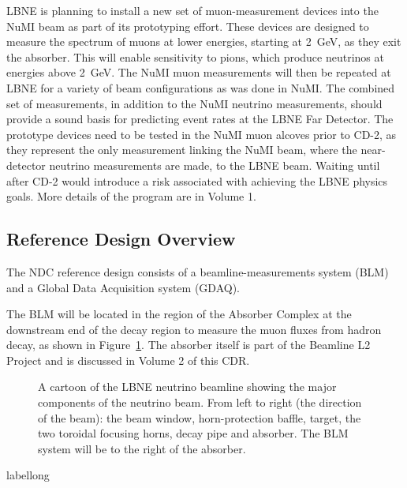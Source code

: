 
LBNE is planning to install a new set of muon-measurement devices into the 
NuMI beam as part of its prototyping effort. 
These devices are designed to measure the spectrum of muons at lower energies, starting at 2~GeV, as they exit the absorber. This will enable sensitivity to pions, which produce neutrinos at energies above 2~GeV. The NuMI muon measurements will then be repeated at LBNE for a variety of beam configurations as was done in NuMI. The combined set of measurements, in addition to the NuMI neutrino measurements, should provide a sound basis for predicting event rates at the LBNE Far Detector.
The prototype devices need to be tested in the NuMI muon alcoves prior to CD-2, as they represent the only measurement linking the NuMI beam, where the near-detector neutrino measurements are made, to the LBNE beam. Waiting until after CD-2 would introduce a risk associated with achieving the LBNE physics goals.  More details of the program are in Volume 1.

\subsection{Reference Design Overview}  %

The NDC reference design consists of a beamline-measurements system (BLM) and a Global Data Acquisition system (GDAQ).

The BLM will be located in the region of the Absorber Complex at the downstream end 
of the decay region to measure the muon fluxes from hadron decay, as shown in Figure~\ref{fig:schematic-nu-beamline-ndc}. The absorber itself is part of the Beamline L2 Project and is discussed in Volume 2 of this CDR. 

\begin{figure}[htbp]
\centering
\caption[Cartoon of the LBNE neutrino beamline components]{A cartoon of the LBNE neutrino beamline showing the major components of the neutrino beam. From left to right (the direction of the beam): the beam window, horn-protection baffle, target, the two toroidal focusing horns, decay pipe and absorber. The BLM system will be to the right of the absorber.}
\label{fig:schematic-nu-beamline-ndc}
\end{figure}
\begin{cdrfigure}[short]{label}{long}
\end{cdrfigure}

